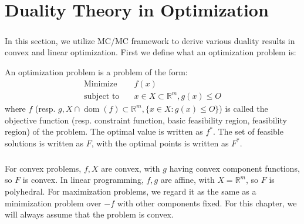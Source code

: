 \chapter{Duality Theory in Optimization}
\label{chap:04}

\paragraph{}In this section, we utilize MC/MC framework to derive various duality results in convex and linear optimization. First we define what an optimization problem is:

\begin{defn}\label{defn:040-opt-prob}
	An optimization problem is a problem of the form:
	\begin{align*}
		\text{Minimize}\quad   & f(x)                                   \\
		\text{subject to}\quad & x\in X\subset \mathbb{R}^m, g(x)\leq O
	\end{align*}
	where $f$ (resp. $g,X\cap \operatorname{dom}(f)\subset \mathbb{R}^m,\{x\in X:g(x)\leq O\}$) is called the objective function (resp. constraint function, basic feasibility region, feasibility region) of the problem. The optimal value is written as $f^\ast$. The set of feasible solutions is written as $F$, with the optimal points is written as $F^\ast$.
\end{defn}

\paragraph{}For convex problems, $f,X$ are convex, with $g$ having convex component functions, so $F$ is convex. In linear programming, $f,g$ are affine, with $X=\mathbb{R}^m$, so $F$ is polyhedral. For maximization problems, we regard it as the same as a minimization problem over $-f$ with other components fixed. For this chapter, we will always assume that the problem is convex.







